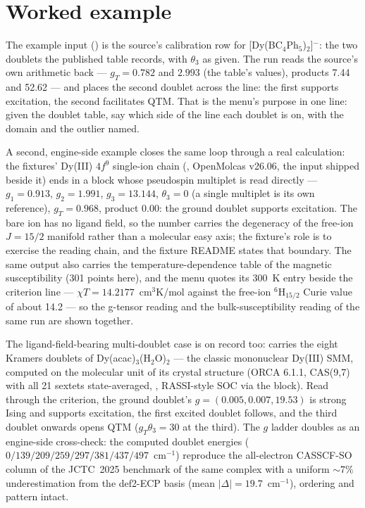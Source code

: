\section{Worked example}

The example input () is the source's
calibration row for [Dy(BC$_4$Ph$_5$)$_2$]$^-$: the two doublets the published
table records, with $\theta_3$ as given.  The run reads the source's own
arithmetic back --- $g_T = 0.782$ and $2.993$ (the table's values), products
7.44 and 52.62 --- and places the second doublet across the line: the first
supports excitation, the second facilitates QTM.  That is the menu's purpose in
one line: given the doublet table, say which side of the line each doublet is
on, with the domain and the outlier named.

A second, engine-side example closes the same loop through a real calculation:
the fixtures' Dy(III) $4f^9$ single-ion chain
(, OpenMolcas v26.06, the input shipped
beside it) ends in a  block whose pseudospin multiplet is
read directly --- $g_1 = 0.913$, $g_2 = 1.991$, $g_3 = 13.144$, $\theta_3 = 0$
(a single multiplet is its own reference), $g_T = 0.968$, product $0.00$: the
ground doublet supports excitation.  The bare ion has no ligand field, so the
number carries the degeneracy of the free-ion $J = 15/2$ manifold rather than a
molecular easy axis; the fixture's role is to exercise the reading chain, and
the fixture README states that boundary.  The same output also carries the
temperature-dependence table of the magnetic susceptibility (301 points here),
and the menu quotes its 300~K entry beside the criterion line ---
$\chi T = 14.2177$~cm$^3$K/mol against the free-ion $^6$H$_{15/2}$ Curie value
of about 14.2 --- so the g-tensor reading and the bulk-susceptibility reading
of the same run are shown together.

The ligand-field-bearing multi-doublet case is on record too:
 carries the eight Kramers doublets
of Dy(acac)$_3$(H$_2$O)$_2$ --- the classic mononuclear Dy(III) SMM, computed
on the molecular unit of its crystal structure (ORCA 6.1.1, CAS(9,7) with
all 21 sextets state-averaged, , RASSI-style SOC via the
 block).  Read through the criterion, the ground doublet's
$g = (0.005, 0.007, 19.53)$ is strong Ising and supports excitation, the
first excited doublet follows, and the third doublet onwards opens QTM
($g_T\theta_3 = 30$ at the third).  The $g$ ladder doubles as an
engine-side cross-check: the computed doublet energies
($0/139/209/259/297/381/437/497$~cm$^{-1}$) reproduce the all-electron
CASSCF-SO column of the JCTC~2025 benchmark of the same complex with a
uniform $\sim7\%$ underestimation from the def2-ECP basis (mean
$|\Delta| = 19.7$~cm$^{-1}$), ordering and pattern intact.

